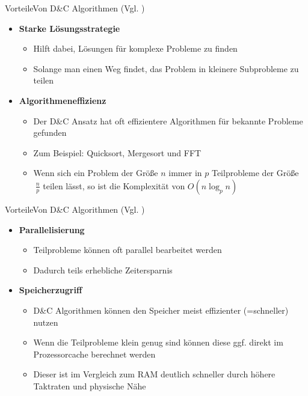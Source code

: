 \begin{frame}{Vorteile}{Von D\&C Algorithmen (Vgl. \cite{wiki:dac})}
    \begin{itemize}
        \item \textbf{Starke Lösungsstrategie}
        \begin{itemize}
            \item Hilft dabei, Lösungen für komplexe Probleme zu finden
            \item Solange man einen Weg findet, das Problem in kleinere Subprobleme zu teilen
        \end{itemize}
        \item \textbf{Algorithmeneffizienz}
        \begin{itemize}
            \item Der D\&C Ansatz hat oft effizientere Algorithmen für bekannte Probleme gefunden
            \item Zum Beispiel: Quicksort, Mergesort und FFT
            \item Wenn sich ein Problem der Größe $n$ immer in $p$ Teilprobleme der Größe $~\frac{n}{p}$ teilen lässt, so ist die Komplexität von $O(n\log_p n)$
        \end{itemize}
    \end{itemize}
\end{frame}

\begin{frame}{Vorteile}{Von D\&C Algorithmen (Vgl. \cite{wiki:dac})}
    \begin{itemize}
        \item \textbf{Parallelisierung}
        \begin{itemize}
            \item Teilprobleme können oft parallel bearbeitet werden
            \item Dadurch teils erhebliche Zeitersparnis
        \end{itemize}
        \item \textbf{Speicherzugriff}
        \begin{itemize}
            \item D\&C Algorithmen können den Speicher meist effizienter (=schneller) nutzen
            \item Wenn die Teilprobleme klein genug sind können diese ggf. direkt im Prozessorcache berechnet werden
            \item Dieser ist im Vergleich zum RAM deutlich schneller durch höhere Taktraten und physische Nähe
        \end{itemize}
    \end{itemize}
\end{frame}

